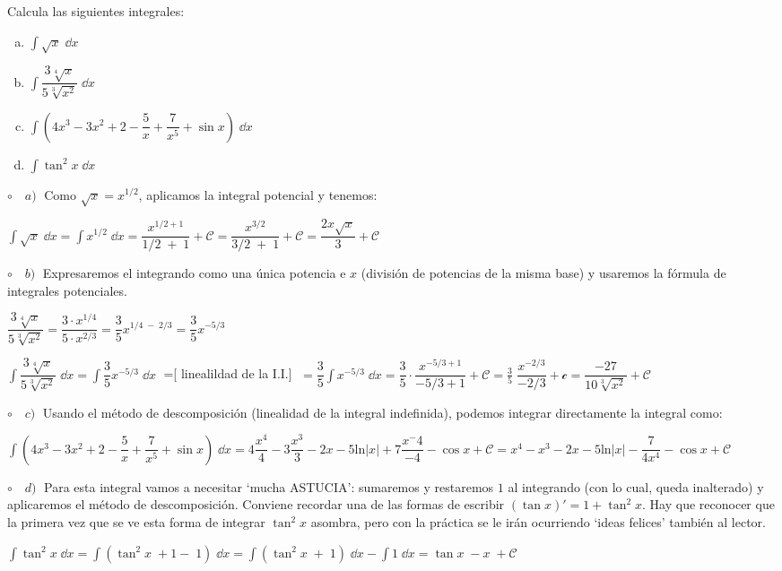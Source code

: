 \begin{ejem} Calcula las siguientes integrales: 
\begin{multicols}{2}
\begin{enumerate}[a) ]
\item $\displaystyle \int \sqrt{x}\; \dd x$
\item $\displaystyle \int \dfrac {3 \sqrt[4]{x}}{5 \sqrt[3]{x^2}}\; \dd x$
\item $\displaystyle \int \left(4x^3-3x^2+2-\dfrac 5 x +\dfrac {7}{x^5} +\sin x  \right)\; \dd x $
\item $\displaystyle \int \tan^2 x \; \dd x $
\end{enumerate}
\end{multicols}
$\circ \quad a)\; $ Como $\sqrt{x}=x^{1/2}$, aplicamos la integral potencial y tenemos:

$\displaystyle \int \sqrt{x}\; \dd x =\displaystyle \int x^{1/2}\; \dd x = \dfrac {x^{1/2+1}}{1/2\; + \; 1}+ \mathcal C=\dfrac {x^{3/2}}{3/2\; + \; 1}+ \mathcal C=\dfrac { 2x \sqrt{x} } { 3 } + \mathcal C$

$\circ \quad b)\; $ Expresaremos el integrando como una única potencia e $x$ (división de potencias de la misma base) y usaremos la fórmula de integrales potenciales.

$\dfrac {3 \sqrt[4]{x}}{5 \sqrt[3]{x^2}}=\dfrac {3 \cdot  x^{1/4}}{5 \cdot x^{2/3}}= \dfrac 3 5 x^{1/4\; -\; 2/3}=\dfrac 3 5 x^{-5/3}$

$\displaystyle \int \dfrac {3 \sqrt[4]{x}}{5 \sqrt[3]{x^2}}\; \dd x=\displaystyle \int \dfrac 3 5 x^{-5/3} \; \dd x \; $ =[ linealildad de la I.I.] $\; = \displaystyle \dfrac 3 5 \int  x^{-5/3} \; \dd x = \dfrac 3 5 \cdot \dfrac {x^{-5/3+1}}{-5/3+1}+\mathcal C= \frac 3 5 \; \dfrac {x^{-2/3}}{-2/3}+ \mathcal c = \dfrac {-27}{10 \sqrt[3]{x^2}}+\mathcal C $

$\circ \quad c)\; $ Usando el método de descomposición (linealidad de la integral indefinida), podemos integrar directamente la integral como:

 $\displaystyle \int \left(4x^3-3x^2+2-\dfrac 5 x +\dfrac {7}{x^5} +\sin x  \right)\; \dd x = 4 \dfrac {x^4}{4}-3\dfrac {x^3}{3}-2 x-5 \mathrm{ln} |x|+ 7 \dfrac {x^-4}{-4}-\cos x + \mathcal C= x^4-x^3-2x-5 \mathrm{ln} |x|-\dfrac {7}{4x^4}-\cos x+\mathcal C$
 
 $\circ \quad d)\; $ Para esta integral vamos a necesitar `mucha ASTUCIA': sumaremos y restaremos $1$ al integrando (con lo cual, queda inalterado) y aplicaremos el método de descomposición. Conviene recordar  una de las formas de escribir $(\tan x)'=1+\tan^2 x$. Hay que reconocer que la primera vez que se ve esta forma de integrar $\tan^2 x$ asombra, pero con la práctica se le irán ocurriendo `ideas felices' también al lector.
 
 $\displaystyle \int \tan^2 x \; \dd x =\displaystyle \int (\tan^2 x  \; + 1 - \; 1)\; \dd x =\displaystyle \int (\tan^2 x \; + \; 1) \; \dd x - \displaystyle \int 1 \; \dd x = \tan x \; - x \; +\mathcal C$
\end{ejem}

